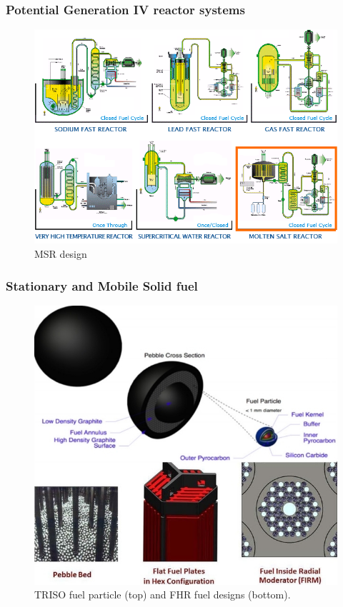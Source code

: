 \documentclass[9pt]{beamer}
\begin{document}
\begin{frame}
\frametitle{Potential Generation IV reactor systems 
	\cite{abram_generation-iv_2008}}
\begin{figure}[t]
	\vspace*{-0.1in}
	\includegraphics[height=0.7\textwidth]{./images/6_types.png}
	\caption{\gls{MSR} design}
\end{figure}            
\end{frame}

\begin{frame}
\frametitle{Stationary and Mobile Solid fuel}
\vspace*{-0.09in}
\begin{figure}[t]
	\hspace*{-0.35in}
	\includegraphics[height=0.63\textwidth]{./images/solid_fuel.jpg}
	\caption{TRISO fuel particle (top) and FHR fuel designs (bottom).} 
\end{figure}   
\end{frame}
\end{document}
